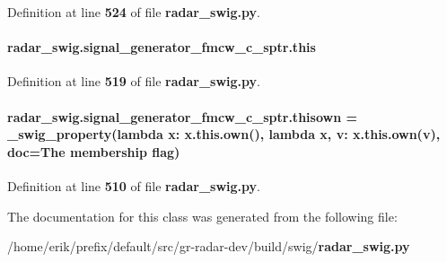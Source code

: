 Definition at line {\bf 524} of file {\bf radar\+\_\+swig.\+py}.

\paragraph[{this}]{\setlength{\rightskip}{0pt plus 5cm}radar\+\_\+swig.\+signal\+\_\+generator\+\_\+fmcw\+\_\+c\+\_\+sptr.\+this}\label{classradar__swig_1_1signal__generator__fmcw__c__sptr_aefa1c0eeaf8ca7770d725378c04c0c1b}


Definition at line {\bf 519} of file {\bf radar\+\_\+swig.\+py}.

\paragraph[{thisown}]{\setlength{\rightskip}{0pt plus 5cm}radar\+\_\+swig.\+signal\+\_\+generator\+\_\+fmcw\+\_\+c\+\_\+sptr.\+thisown = {\bf \+\_\+swig\+\_\+property}(lambda x\+: x.\+this.\+own(), lambda {\bf x}, v\+: x.\+this.\+own(v), doc=\textquotesingle{}The membership flag\textquotesingle{})\hspace{0.3cm}{\ttfamily [static]}}\label{classradar__swig_1_1signal__generator__fmcw__c__sptr_af21a2178e9791f79c2c7b1bbf32f6e39}


Definition at line {\bf 510} of file {\bf radar\+\_\+swig.\+py}.



The documentation for this class was generated from the following file\+:\begin{DoxyCompactItemize}
\item 
/home/erik/prefix/default/src/gr-\/radar-\/dev/build/swig/{\bf radar\+\_\+swig.\+py}\end{DoxyCompactItemize}
